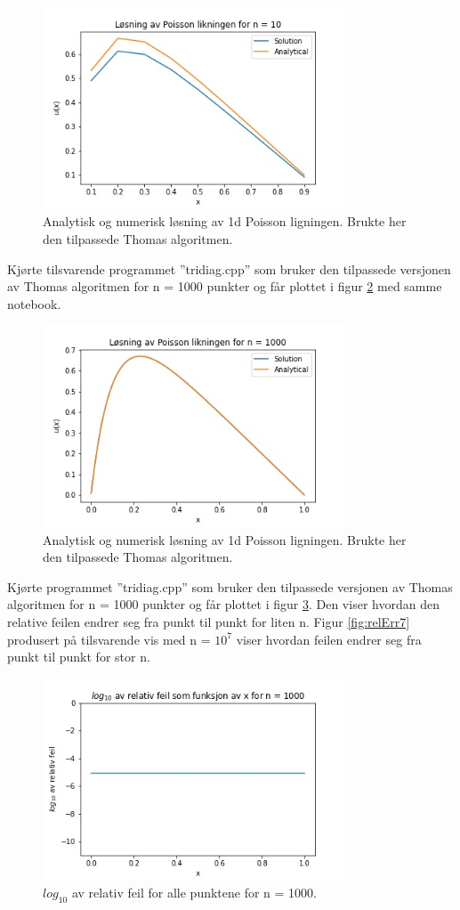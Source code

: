 \documentclass[reprint,english,notitlepage]{revtex4-1}
\begin{document}
	\begin{figure}[H]
		\includegraphics[width=90mm]{../Results/losning1.jpg}
		\caption{Analytisk og numerisk løsning av 1d Poisson ligningen. Brukte her den tilpassede Thomas algoritmen.}
		\label{fig:losning1}
	\end{figure}

	Kjørte tilsvarende programmet ''tridiag.cpp'' som bruker den tilpassede versjonen av Thomas algoritmen for n = 1000 punkter og får plottet i figur \ref{fig:losning} med samme notebook.

	\begin{figure}[H]
		\includegraphics[width=90mm]{../Results/losning.jpg}
		\caption{Analytisk og numerisk løsning av 1d Poisson ligningen. Brukte her den tilpassede Thomas algoritmen.}
		\label{fig:losning}
	\end{figure}
	
	Kjørte programmet ''tridiag.cpp'' som bruker den tilpassede versjonen av Thomas algoritmen for n = 1000 punkter og får plottet i figur \ref{fig:relErr3}. Den viser hvordan den relative feilen endrer seg fra punkt til punkt for liten n. Figur \ref{fig:relErr7} produsert på tilsvarende vis med n = $10^7$ viser hvordan feilen endrer seg fra punkt til punkt for stor n.
	
	\begin{figure}[H]
		\includegraphics[width=90mm]{../Results/relErrx.jpg}
		\caption{$log_{10}$ av relativ feil for alle punktene for n = 1000.}
		\label{fig:relErr3}
	\end{figure}
\end{document}
